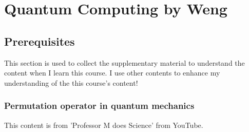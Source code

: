 \documentclass[../../note.tex]{subfiles}
\begin{document}
\chapter{Quantum Computing by Weng}

\section{Prerequisites}
This section is used to collect the supplementary material to understand the content when I learn this course. I use other contents to enhance my understanding of the this course's content!

\subsection{Permutation operator in quantum mechanics}
This content is from 'Professor M does Science' from YouTube.
\end{document}
